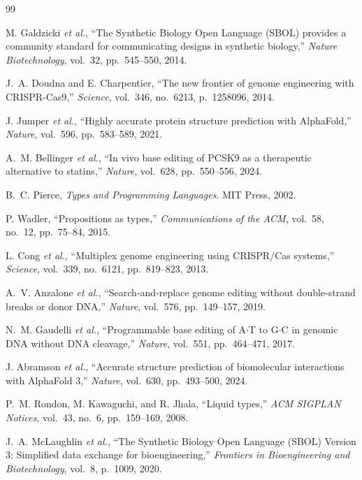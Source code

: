 \documentclass[12pt,a4paper]{article}
\begin{document}
\begin{thebibliography}{99}

M. Galdzicki \textit{et al.}, ``The Synthetic Biology Open Language (SBOL) provides a community standard for communicating designs in synthetic biology,'' \textit{Nature Biotechnology}, vol.~32, pp.~545--550, 2014.

J.~A. Doudna and E. Charpentier, ``The new frontier of genome engineering with CRISPR-Cas9,'' \textit{Science}, vol.~346, no.~6213, p.~1258096, 2014.

J. Jumper \textit{et al.}, ``Highly accurate protein structure prediction with AlphaFold,'' \textit{Nature}, vol.~596, pp.~583--589, 2021.

A.~M. Bellinger \textit{et al.}, ``In vivo base editing of PCSK9 as a therapeutic alternative to statins,'' \textit{Nature}, vol.~628, pp.~550--556, 2024.

B.~C. Pierce, \textit{Types and Programming Languages}. MIT Press, 2002.

P. Wadler, ``Propositions as types,'' \textit{Communications of the ACM}, vol.~58, no.~12, pp.~75--84, 2015.

L. Cong \textit{et al.}, ``Multiplex genome engineering using CRISPR/Cas systems,'' \textit{Science}, vol.~339, no.~6121, pp.~819--823, 2013.

A.~V. Anzalone \textit{et al.}, ``Search-and-replace genome editing without double-strand breaks or donor DNA,'' \textit{Nature}, vol.~576, pp.~149--157, 2019.

N.~M. Gaudelli \textit{et al.}, ``Programmable base editing of A$\cdot$T to G$\cdot$C in genomic DNA without DNA cleavage,'' \textit{Nature}, vol.~551, pp.~464--471, 2017.

J. Abramson \textit{et al.}, ``Accurate structure prediction of biomolecular interactions with AlphaFold 3,'' \textit{Nature}, vol.~630, pp.~493--500, 2024.

P.~M. Rondon, M. Kawaguchi, and R. Jhala, ``Liquid types,'' \textit{ACM SIGPLAN Notices}, vol.~43, no.~6, pp.~159--169, 2008.

J.~A. McLaughlin \textit{et al.}, ``The Synthetic Biology Open Language (SBOL) Version 3: Simplified data exchange for bioengineering,'' \textit{Frontiers in Bioengineering and Biotechnology}, vol.~8, p.~1009, 2020.


\end{thebibliography}
\end{document}

